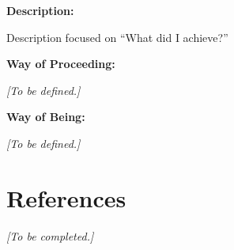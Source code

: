 \documentclass[12pt,a4paper]{article}
\newcommand{\placeholder}[1]{
	\textit{\textcolor{secondary}{[#1]}}
}
\begin{document}
	\textbf{Description:}
	
	Description focused on ``What did I achieve?''
	
	\vspace{0.3cm}
	
	\textbf{Way of Proceeding:}
	
	\placeholder{To be defined.}
	
	\textbf{Way of Being:}
	
	\placeholder{To be defined.}
	
	
	\section*{References}
	
	\placeholder{To be completed.}
	
\end{document}
